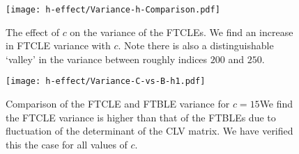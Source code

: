 \begin{figure}
	\centering
    \texttt{[image: h-effect/Variance-h-Comparison.pdf]}
    \caption{The effect of $c$ on the variance of the FTCLEs. We find an increase in FTCLE variance with $c$. Note there is also a distinguishable `valley' in the variance between roughly indices $200$ and $250$.}
    \label{fig:h-Variance}
\end{figure}

\begin{figure}
	\centering
    \texttt{[image: h-effect/Variance-C-vs-B-h1.pdf]}
    \caption{Comparison of the FTCLE and FTBLE variance for $c = 15$We find the FTCLE variance is higher than that of the FTBLEs due to fluctuation of the determinant of the CLV matrix. We have verified this the case for all values of $c$.}
    \label{fig:h-variance-c-vs-b}
\end{figure}
